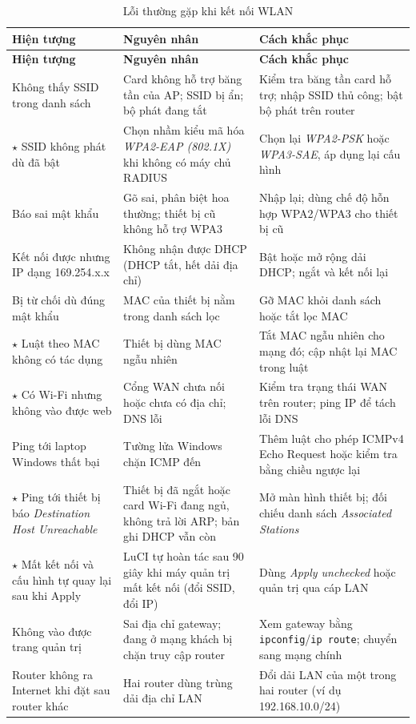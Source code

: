 \documentclass[12pt,a4paper]{article}
\numberwithin{figure}{section}
\numberwithin{table}{section}
\newcommand{\mono}[1]{\texttt{#1}}
\begin{document}
\begin{longtable}{@{}P{3.3cm} P{5.4cm} P{6.0cm}@{}}
  \caption{Lỗi thường gặp khi kết nối WLAN}\label{tab:loi}\\
  \toprule
  \textbf{Hiện tượng} & \textbf{Nguyên nhân} & \textbf{Cách khắc phục}\\
  \midrule\endfirsthead
  \toprule
  \textbf{Hiện tượng} & \textbf{Nguyên nhân} & \textbf{Cách khắc phục}\\
  \midrule\endhead
  \bottomrule\endfoot
  Không thấy SSID trong danh sách & Card không hỗ trợ băng tần của AP; SSID bị
  ẩn; bộ phát đang tắt & Kiểm tra băng tần card hỗ trợ; nhập SSID thủ công;
  bật bộ phát trên router\\
  $\star$ SSID không phát dù đã bật & Chọn nhầm kiểu mã hóa \emph{WPA2-EAP
  (802.1X)} khi không có máy chủ RADIUS & Chọn lại \emph{WPA2-PSK} hoặc
  \emph{WPA3-SAE}, áp dụng lại cấu hình\\
  Báo sai mật khẩu & Gõ sai, phân biệt hoa thường; thiết bị cũ không hỗ trợ WPA3
  & Nhập lại; dùng chế độ hỗn hợp WPA2/WPA3 cho thiết bị cũ\\
  Kết nối được nhưng IP dạng 169.254.x.x & Không nhận được DHCP (DHCP tắt, hết dải
  địa chỉ) & Bật hoặc mở rộng dải DHCP; ngắt và kết nối lại\\
  Bị từ chối dù đúng mật khẩu & MAC của thiết bị nằm trong danh sách lọc & Gỡ
  MAC khỏi danh sách hoặc tắt lọc MAC\\
  $\star$ Luật theo MAC không có tác dụng & Thiết bị dùng MAC ngẫu nhiên & Tắt
  MAC ngẫu nhiên cho mạng đó; cập nhật lại MAC trong luật\\
  $\star$ Có Wi-Fi nhưng không vào được web & Cổng WAN chưa nối hoặc chưa có địa
  chỉ; DNS lỗi & Kiểm tra trạng thái WAN trên router; ping IP để tách lỗi DNS\\
  Ping tới laptop Windows thất bại & Tường lửa Windows chặn ICMP đến & Thêm luật
  cho phép ICMPv4 Echo Request hoặc kiểm tra bằng chiều ngược lại\\
  $\star$ Ping tới thiết bị báo \emph{Destination Host Unreachable} & Thiết bị
  đã ngắt hoặc card Wi-Fi đang ngủ, không trả lời ARP; bản ghi DHCP vẫn còn &
  Mở màn hình thiết bị; đối chiếu danh sách \emph{Associated Stations}\\
  $\star$ Mất kết nối và cấu hình tự quay lại sau khi Apply & LuCI tự hoàn tác
  sau 90 giây khi máy quản trị mất kết nối (đổi SSID, đổi IP) & Dùng
  \emph{Apply unchecked} hoặc quản trị qua cáp LAN\\
  Không vào được trang quản trị & Sai địa chỉ gateway; đang ở mạng khách bị
  chặn truy cập router & Xem gateway bằng \mono{ipconfig}/\mono{ip route};
  chuyển sang mạng chính\\
  Router không ra Internet khi đặt sau router khác & Hai router dùng trùng dải
  địa chỉ LAN & Đổi dải LAN của một trong hai router (ví dụ 192.168.10.0/24)\\
\end{longtable}
\end{document}
